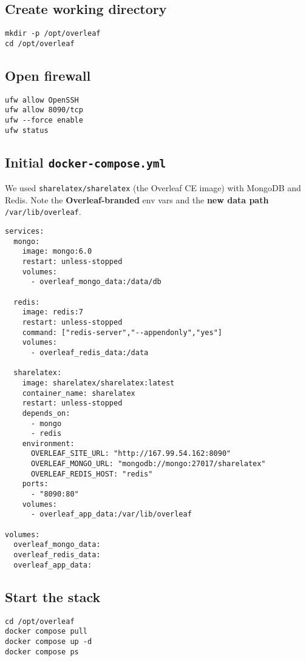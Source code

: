 \subsection{Create working directory}
\begin{verbatim}
mkdir -p /opt/overleaf
cd /opt/overleaf
\end{verbatim}

\subsection{Open firewall}
\begin{verbatim}
ufw allow OpenSSH
ufw allow 8090/tcp
ufw --force enable
ufw status
\end{verbatim}

\subsection{Initial \texttt{docker-compose.yml}}
We used \texttt{sharelatex/sharelatex} (the Overleaf CE image) with MongoDB and Redis. Note the \textbf{Overleaf-branded} env vars and the \textbf{new data path} \texttt{/var/lib/overleaf}.
\begin{verbatim}
services:
  mongo:
    image: mongo:6.0
    restart: unless-stopped
    volumes:
      - overleaf_mongo_data:/data/db

  redis:
    image: redis:7
    restart: unless-stopped
    command: ["redis-server","--appendonly","yes"]
    volumes:
      - overleaf_redis_data:/data

  sharelatex:
    image: sharelatex/sharelatex:latest
    container_name: sharelatex
    restart: unless-stopped
    depends_on:
      - mongo
      - redis
    environment:
      OVERLEAF_SITE_URL: "http://167.99.54.162:8090"
      OVERLEAF_MONGO_URL: "mongodb://mongo:27017/sharelatex"
      OVERLEAF_REDIS_HOST: "redis"
    ports:
      - "8090:80"
    volumes:
      - overleaf_app_data:/var/lib/overleaf

volumes:
  overleaf_mongo_data:
  overleaf_redis_data:
  overleaf_app_data:
\end{verbatim}

\subsection{Start the stack}
\begin{verbatim}
cd /opt/overleaf
docker compose pull
docker compose up -d
docker compose ps
\end{verbatim}

